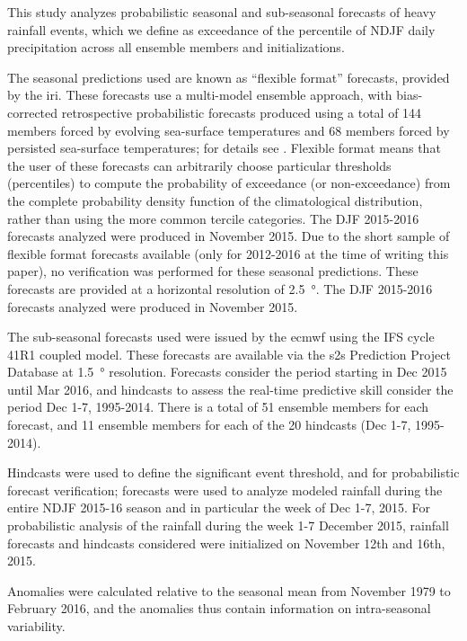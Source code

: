\documentclass{ametsoc}
\begin{document}
This study analyzes probabilistic seasonal and sub-seasonal forecasts of heavy rainfall events, which we define as exceedance of the  percentile of NDJF daily precipitation across all ensemble members and initializations.

The seasonal predictions used  are known as ``flexible format'' forecasts, provided by the \gls{iri}.
These forecasts use a multi-model ensemble approach, with bias-corrected retrospective probabilistic forecasts produced using a total of 144 members forced by evolving sea-surface temperatures and 68 members forced by persisted sea-surface temperatures; for details see \citet{Barnston2010}.
Flexible format means that the user of these forecasts can arbitrarily choose  particular thresholds (percentiles) to compute the  probability of exceedance (or non-exceedance) from the complete  probability density function of the climatological distribution,  rather than using the more common tercile categories.
The DJF 2015-2016 forecasts analyzed were produced in  November 2015.
Due to the short sample of flexible format forecasts available (only for 2012-2016 at the time of writing this paper), no verification was performed for these seasonal predictions.
These forecasts are provided at a horizontal  resolution of \SI{2.5}{\degree}.
The DJF 2015-2016 forecasts analyzed were produced in November 2015.

The sub-seasonal forecasts used were issued by the \gls{ecmwf} using the IFS cycle 41R1 coupled model.
These forecasts are available via the \gls{s2s} Prediction Project Database \citep{Vitart2016} at \SI{1.5}{\degree} resolution.
Forecasts consider the period starting in Dec 2015 until Mar 2016, and hindcasts to assess the real-time predictive skill consider the period Dec 1-7, 1995-2014.
There is a total of 51 ensemble members for each forecast, and 11 ensemble members for each of the 20 hindcasts (Dec 1-7, 1995-2014).

Hindcasts were used to define the significant event threshold, and for probabilistic forecast verification; forecasts were used to analyze modeled rainfall during the entire NDJF 2015-16 season and in particular the week of Dec 1-7, 2015.
For probabilistic analysis of the rainfall during the week 1-7 December 2015, rainfall forecasts and hindcasts considered were initialized on November 12th and 16th, 2015.

Anomalies were calculated relative to the seasonal mean from November 1979 to February 2016, and the anomalies thus contain information on intra-seasonal variability.
\end{document}
